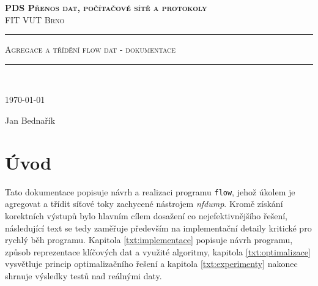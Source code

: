 \documentclass[12pt,a4paper,titlepage,final]{article}
\begin{document}
\setcounter{page}{1}

    
\begin{centering}
\textsc{\textbf{PDS Přenos dat, počítačové sítě a protokoly} \\
FIT VUT Brno\\
}

\rule{\textwidth}{1.6pt}\vspace*{-\baselineskip}\vspace*{23pt} 

\begin{large}
\textsc{Agregace a třídění flow dat - dokumentace}
\end{large}

\rule{\textwidth}{1.6pt}\\ %

\vspace*{5pt} 
\begin{footnotesize}
\today
\end{footnotesize}
\vspace*{5pt} 

\begin{large}
Jan Bednařík
\end{large}

\end{centering}



\section{Úvod}
Tato dokumentace popisuje návrh a realizaci programu \texttt{flow}, jehož úkolem je agregovat a třídit síťové toky zachycené nástrojem \emph{nfdump}. Kromě získání korektních výstupů bylo hlavním cílem dosažení co nejefektivnějšího řešení, následující text se tedy zaměřuje především na implementační detaily kritické pro rychlý běh programu. Kapitola \ref{txt:implementace} popisuje návrh programu, způsob reprezentace klíčových dat a využité algoritmy, kapitola \ref{txt:optimalizace} vysvětluje princip optimalizačního řešení a kapitola \ref{txt:experimenty} nakonec shrnuje výsledky testů nad reálnými daty.

\end{document}
